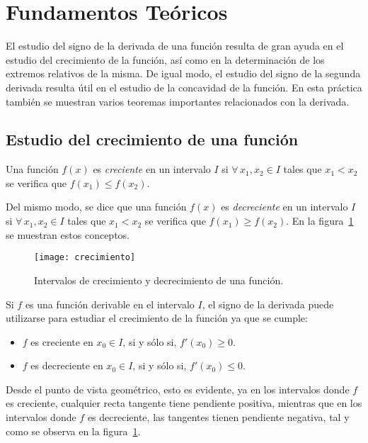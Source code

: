 \documentclass[a4paper]{article}
\begin{document}
\sloppy
{}

\bigskip
\section*{Fundamentos Teóricos}
El estudio del signo de la derivada de una función resulta de gran ayuda en el estudio del crecimiento de la función, así como en la determinación de los extremos relativos de la misma. De igual modo, el estudio del signo de la segunda derivada resulta útil en el estudio de la concavidad de la función. En esta práctica también se muestran varios teoremas importantes relacionados con la derivada.

\subsection*{Estudio del crecimiento de una función}
Una función $f(x)$ es \emph{creciente} en un intervalo $I$ si $\forall\, x_1, x_2 \in I$ tales que $x_1<x_2$ se verifica que $f(x_1)\leq f(x_2)$. 

Del mismo modo, se dice que una función $f(x)$ es \emph{decreciente} en un intervalo $I$ si $\forall\, x_1, x_2 \in I$ tales que $x_1<x_2$ se verifica que $f(x_1)\geq f(x_2)$. En la figura~\ref{g:crecimiento} se muestran estos conceptos.

\begin{figure}[h!]
\centering
\texttt{[image: crecimiento]}
\caption{Intervalos de crecimiento y decrecimiento de una función.}
\label{g:crecimiento}
\end{figure}

Si $f$ es una función derivable en el intervalo $I$, el signo de la derivada puede utilizarse para estudiar el crecimiento de la función ya que se cumple:
\begin{itemize}
\item $f$ es creciente en $x_0\in I$, si y sólo si, $f'(x_0)\geq 0$.
\item $f$ es decreciente en $x_0\in I$, si y sólo si, $f'(x_0)\leq 0$.
\end{itemize}

Desde el punto de vista geométrico, esto es evidente, ya en los intervalos donde $f$ es creciente, cualquier recta tangente tiene pendiente positiva, mientras que en los intervalos donde $f$ es decreciente, las tangentes tienen pendiente negativa, tal y como se observa en la figura~\ref{g:crecimiento}.
\end{document}
